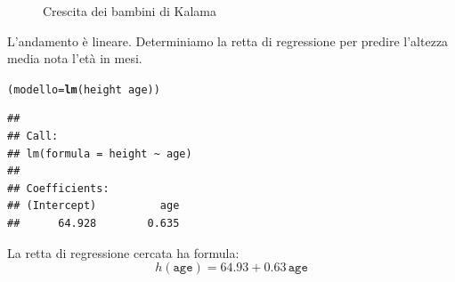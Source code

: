 \documentclass[onecolumn,12pt]{book}\usepackage[]{graphicx}\usepackage[]{color}
\makeatletter
\newcommand{\hlopt}[1]{\textcolor[rgb]{0,0,0}{#1}}%
\newcommand{\hlstd}[1]{\textcolor[rgb]{0.345,0.345,0.345}{#1}}%
\newcommand{\hlkwb}[1]{\textcolor[rgb]{0.69,0.353,0.396}{#1}}%
\newcommand{\hlkwd}[1]{\textcolor[rgb]{0.737,0.353,0.396}{\textbf{#1}}}%
\newenvironment{kframe}{%
 \def\at@end@of@kframe{}%
 \ifinner\ifhmode%
  \def\at@end@of@kframe{\end{minipage}}%
  \begin{minipage}{\columnwidth}%
 \fi\fi%
 \def\FrameCommand##1{\hskip\@totalleftmargin \hskip-\fboxsep
 \colorbox{shadecolor}{##1}\hskip-\fboxsep
     \hskip-\linewidth \hskip-\@totalleftmargin \hskip\columnwidth}%
 \MakeFramed {\advance\hsize-\width
   \@totalleftmargin\z@ \linewidth\hsize
   \@setminipage}}%
 {\par\unskip\endMakeFramed%
 \at@end@of@kframe}
\newenvironment{knitrout}{}{} %
\makeatother
\begin{document}
\begin{figure}[htbp]
\begin{center}
\begin{knitrout}
{}



\end{knitrout}
\caption{Crescita dei bambini di Kalama}
\label{kalama}
\end{center}
\end{figure}
L'andamento \`e lineare. Determiniamo la retta di regressione
per predire l'altezza media nota l'et\`a in mesi.
\begin{knitrout}
\color{fgcolor}\begin{kframe}
\begin{alltt}
\hlstd{(modello}\hlkwb{=}\hlkwd{lm}\hlstd{(height}\hlopt{~}\hlstd{age))}
\end{alltt}
\begin{verbatim}
## 
## Call:
## lm(formula = height ~ age)
## 
## Coefficients:
## (Intercept)          age  
##      64.928        0.635
\end{verbatim}
\end{kframe}
\end{knitrout}
La retta di regressione cercata ha formula:
$$h(\texttt{age})=64.93+ 0.63\, \texttt{age}$$
\end{document}
